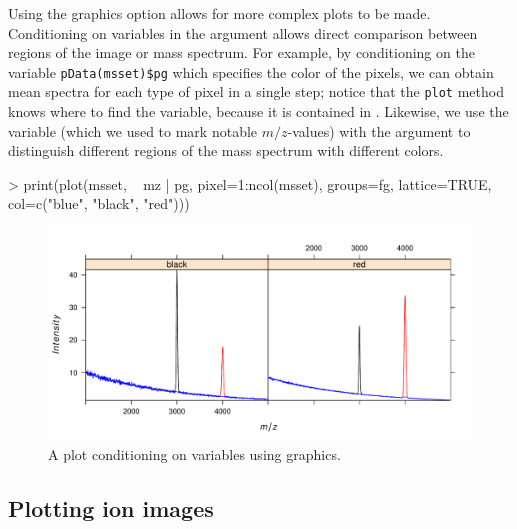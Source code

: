 \documentclass{article}
\begin{document}
Using the  graphics option allows for more complex plots to be made. Conditioning on variables in the  argument allows direct comparison between regions of the image or mass spectrum. For example, by conditioning on the variable \verb|pData(msset)$pg| which specifies the color of the pixels, we can obtain mean spectra for each type of pixel in a single step; notice that the \verb|plot| method knows where to find the  variable, because it is contained in . Likewise, we use the  variable (which we used to mark notable $m/z$-values) with the argument  to distinguish different regions of the mass spectrum with different colors.
\begin{Schunk}
\begin{Sinput}
> print(plot(msset, ~ mz | pg, pixel=1:ncol(msset), groups=fg, lattice=TRUE, col=c("blue", "black", "red")))
\end{Sinput}
\end{Schunk}
\begin{figure}
\begin{center}
\includegraphics{Cardinal-plotting-018}
\caption{\small A plot conditioning on variables using  graphics.}
\end{center}
\end{figure}

\subsection{Plotting ion images}
\end{document}
